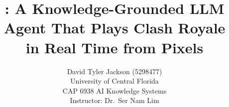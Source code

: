 \documentclass[10pt,twocolumn,letterpaper]{article}
\title{\cb{}: A Knowledge-Grounded LLM Agent That Plays Clash Royale\\in Real Time from Pixels}
\author{David Tyler Jackson (5298477)\\
University of Central Florida\\
{\normalsize CAP 6938 AI Knowledge Systems}\\
{\normalsize Instructor: Dr.\ Ser Nam Lim}
}
\begin{document}
\maketitle







{
    \small
    
    
}
\end{document}
